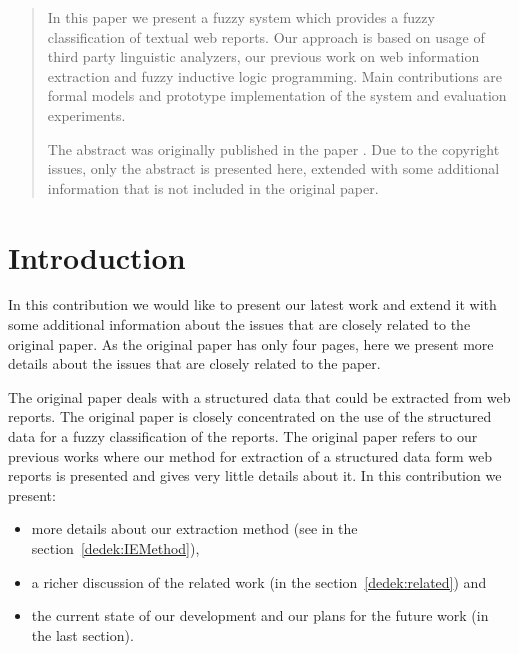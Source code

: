 
\MakeContributionTitle

\begin{multicols}{2}

\begin{abstract}
In this paper we present a fuzzy system which provides a fuzzy classification of textual web reports. Our approach is based on usage of third party linguistic analyzers, our previous work on web information extraction and fuzzy inductive logic programming. Main contributions are formal models and prototype implementation of the system and evaluation experiments. 

\medskip

The abstract was originally published in the paper \cite{Dedek:FuzzWI}. Due to the copyright issues, only the abstract is presented here, extended with some additional information that is not included in the original paper.
\end{abstract}


\section{Introduction}
In this contribution we would like to present our latest work \cite{Dedek:FuzzWI} and extend it with some additional information about the issues that are closely related to the original paper. As the original paper has only four pages, here we present more details about the issues that are closely related to the paper.

The original paper deals with a structured data that could be extracted from web reports. The original paper is closely concentrated on the use of the structured data for a fuzzy classification of the reports. The original paper refers to our previous works where our method for extraction of a structured data form web reports is presented and gives very little details about it. In this contribution we present:
\begin{itemize}
	\item more details about our extraction method (see in the section~\ref{dedek:IEMethod}),
	\item a richer discussion of the related work (in the section~\ref{dedek:related}) and
	\item the current state of our development and our plans for the future work (in the last section).
\end{itemize}


\end{multicols}
